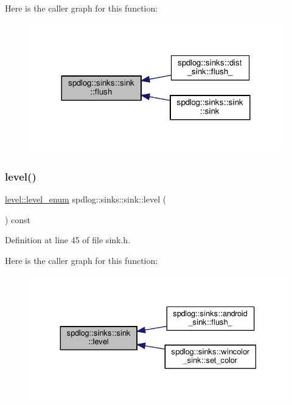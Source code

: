 Here is the caller graph for this function\+:
\nopagebreak
\begin{figure}[H]
\begin{center}
\leavevmode
\includegraphics[width=312pt]{classspdlog_1_1sinks_1_1sink_a8a0674ae3bca8f1617aef820e23a2ccd_icgraph}
\end{center}
\end{figure}
\mbox{\label{classspdlog_1_1sinks_1_1sink_ae59ca2b418c5cdfed1c04e49a444be1c}} 
\subsubsection{\texorpdfstring{level()}{level()}}
{\footnotesize\ttfamily \hyperlink{namespacespdlog_1_1level_a35f5227e5daf228d28a207b7b2aefc8b}{level\+::level\+\_\+enum} spdlog\+::sinks\+::sink\+::level (\begin{DoxyParamCaption}{ }\end{DoxyParamCaption}) const\hspace{0.3cm}{\ttfamily [inline]}}



Definition at line 45 of file sink.\+h.

Here is the caller graph for this function\+:
\nopagebreak
\begin{figure}[H]
\begin{center}
\leavevmode
\includegraphics[width=330pt]{classspdlog_1_1sinks_1_1sink_ae59ca2b418c5cdfed1c04e49a444be1c_icgraph}
\end{center}
\end{figure}
\mbox{\label{classspdlog_1_1sinks_1_1sink_a51d8f34ad79064e0dc13c6013236e427}} 
